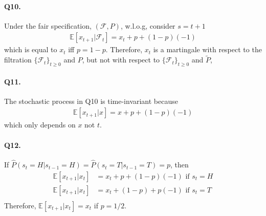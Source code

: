 \documentclass[11pt]{article}
\theoremstyle{definition}
\theoremstyle{boldtitle} %
\numberwithin{equation}{section}
\numberwithin{figure}{section}
\numberwithin{table}{section}
\begin{document}
\paragraph{Q10.}
Under the fair specification, $(\mathcal{F}, P)$,
w.l.o.g, consider $s = t+1$
\begin{align*}
    \mathbb{E}[x_{t+1} | \mathcal{F}_t] = x_t + p + (1 - p) (-1)
\end{align*}
which is equal to $x_t$ iff $p = 1- p$.
Therefore, $x_t$ is a martingale with respect to the filtration $\{\mathcal{F}_t \}_{t \geq 0}$ and $P$,
but not with respect to $\{\mathcal{F}_t \}_{t \geq 0}$ and $\tilde{P}$,


\paragraph{Q11.}
The stochastic process in Q10 is time-invariant because 
\begin{align*}
    \mathbb{E}[x_{t+1} | x] = x + p + (1 - p) (-1)
\end{align*}
which only depends on $x$ not $t$.


\paragraph{Q12.}
If $\hat{P}(s_t = H | s_{t-1} = H) = \hat{P}(s_t = T | s_{t-1} = T) = p$,
then 
\begin{align*}
    \mathbb{E}[x_{t+1}|x_t] & = x_t + p + (1-p)(-1) \text{ if } s_t = H \\
    \mathbb{E}[x_{t+1}|x_t] & = x_t + (1 - p) + p(-1) \text{ if } s_t = T \\
\end{align*}
Therefore, $\mathbb{E}[x_{t+1}|x_t] = x_t$ if $p = 1/2$.


\end{document}
